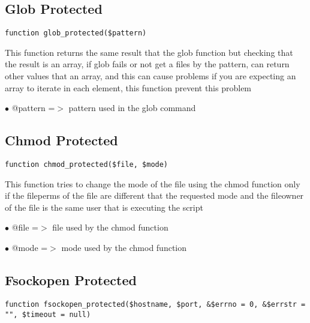 \documentclass[a4paper]{book}
\begin{document}
\hypertarget{toc138}{}
\subsection{Glob Protected}

\begin{lstlisting}
function glob_protected($pattern)
\end{lstlisting}

This function returns the same result that the glob function but checking
that the result is an array, if glob fails or not get a files by the pattern,
can return other values that an array, and this can cause problems if you are
expecting an array to iterate in each element, this function prevent this
problem

\begin{compactitem}
\item[\color{myblue}$\bullet$] @pattern =$>$ pattern used in the glob command
\end{compactitem}

\hypertarget{toc139}{}
\subsection{Chmod Protected}

\begin{lstlisting}
function chmod_protected($file, $mode)
\end{lstlisting}

This function tries to change the mode of the file using the chmod function
only if the fileperms of the file are different that the requested mode and
the fileowner of the file is the same user that is executing the script

\begin{compactitem}
\item[\color{myblue}$\bullet$] @file =$>$ file used by the chmod function
\item[\color{myblue}$\bullet$] @mode =$>$ mode used by the chmod function
\end{compactitem}

\hypertarget{toc140}{}
\subsection{Fsockopen Protected}

\begin{lstlisting}
function fsockopen_protected($hostname, $port, &$errno = 0, &$errstr = "", $timeout = null)
\end{lstlisting}
\end{document}
